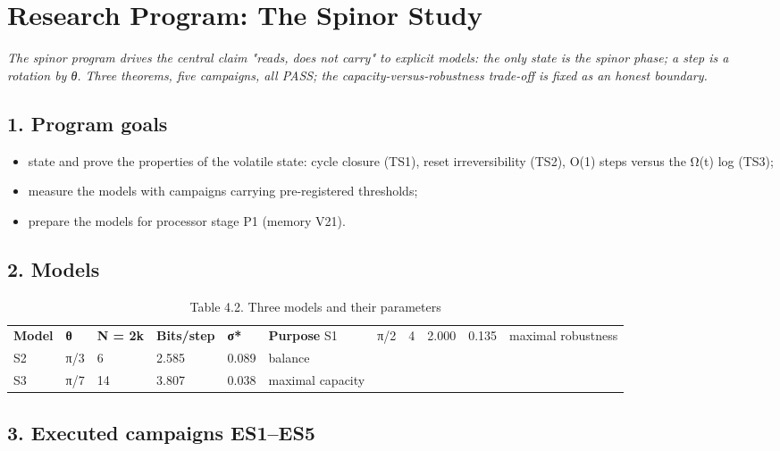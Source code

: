 \documentclass[11pt,a4paper]{article}
\begin{document}
\section{Research Program: The Spinor Study}

\noindent\textit{\color{copper}The spinor program drives the central claim "reads, does not carry" to explicit models: the only state is the spinor phase; a step is a rotation by θ. Three theorems, five campaigns, all PASS; the capacity-versus-robustness trade-off is fixed as an honest boundary.}

\subsection{1. Program goals}

\begin{itemize}
  \item state and prove the properties of the volatile state: cycle closure (TS1), reset irreversibility (TS2), O(1) steps versus the Ω(t) log (TS3);
  \item measure the models with campaigns carrying pre-registered thresholds;
  \item prepare the models for processor stage P1 (memory V21).
\end{itemize}

\subsection{2. Models}

\begin{table}[htbp]\centering\small
\caption{Table 4.2. Three models and their parameters}
\begin{tabular}{p{} p{} p{} p{} p{} p{}}
\toprule
\textbf{Model} & \textbf{θ} & \textbf{N = 2k} & \textbf{Bits/step} & \textbf{σ*} & \textbf{Purpose}
\midrule
S1 & π/2 & 4 & 2.000 & 0.135 & maximal robustness \\
S2 & π/3 & 6 & 2.585 & 0.089 & balance \\
S3 & π/7 & 14 & 3.807 & 0.038 & maximal capacity \\
\bottomrule
\end{tabular}
\end{table}

\subsection{3. Executed campaigns ES1–ES5}
\end{document}
